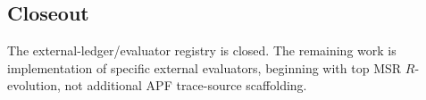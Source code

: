 \subsection{Closeout}
The external-ledger/evaluator registry is closed.  The remaining work is implementation of specific external evaluators, beginning with top MSR $R$-evolution, not additional APF trace-source scaffolding.

\begin{center}
\end{center}
